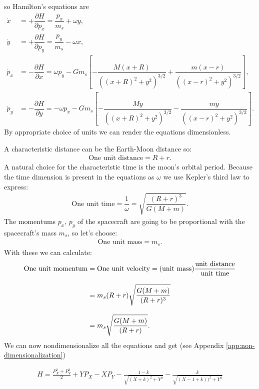so Hamilton's equations are
\begin{align}
\dot{x} &= +\dfrac{\partial H}{\partial p_x} = \dfrac{p_x}{m_s} + \omega y, \\[0.4cm]
\dot{y} &= +\dfrac{\partial H}{\partial p_y} = \dfrac{p_y}{m_s} - \omega x, \\[0.4cm]
\dot{p}_x &= -\dfrac{\partial H}{\partial x} = \omega p_y - G m_s \left[-\dfrac{M(x+R)}{((x+R)^2+y^2)^{3/2}} + \dfrac{m(x-r)}{((x-r)^2+y^2)^{3/2}} \right], \\[0.4cm]
\dot{p}_y &= -\dfrac{\partial H}{\partial y} = -\omega p_x - G m_s \left[- \dfrac{M y}{((x+R)^2+y^2)^{3/2}} - \dfrac{m y}{((x-r)^2+y^2)^{3/2}}\right].
\end{align}
By appropriate choice of units we can render the equations dimensionless.

A characteristic distance can be the Earth-Moon distance so:
\begin{align}
\text{One unit distance} = R+r .
\end{align}
A natural choice for the characteristic time is the moon's orbital period. Because the time dimension is present in the equations as $\omega$ we use Kepler's third law to express: \cite{Murray1999}
\begin{align}
\text{One unit time} = \dfrac{1}{\omega} = \sqrt{\dfrac{(R+r)^3}{G(M+m)}}.
\end{align}
The momentums $p_x$, $p_y$ of the spacecraft are going to be proportional with the spacecraft's mass $m_s$, so let's choose:
\begin{align}
\text{One unit mass} = m_s.
\end{align}
With these we can calculate:
\begin{align}
\notag \text{One unit momentum} &= \text{One unit velocity} = (\text{unit mass})\dfrac{\text{unit distance}}{\text{unit time}} \\[0.3cm]
\notag &= m_s(R+r)\sqrt{\dfrac{G(M+m)}{(R+r)^3}} \\[0.3cm]
&= m_s \sqrt{\dfrac{G(M+m)}{(R+r)}}.
\end{align}
We can now nondimensionalize all the equations and get (see Appendix \ref{app:non-dimensionalization})

\begin{align}
  H = \frac{P_X^2 + P_Y^2}{2} + Y P_X - X P_Y - \frac{1 -k}{\sqrt{(X+k)^2 + Y^2 }} - \frac{k}{\sqrt{(X-1+k))^2 + Y^2}}
\end{align}

